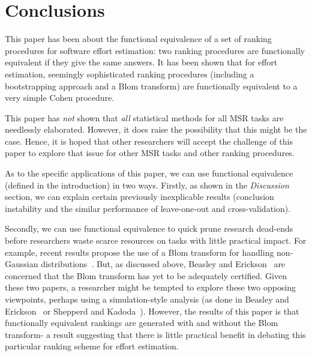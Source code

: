 \documentclass{sig-alternate}
\newcommand{\fig}[1]{Figure~\ref{fig:#1}}
\begin{document}


\section{Conclusions}

This paper has been about the functional equivalence of a set
of ranking procedures for software effort estimation: two
ranking procedures are functionally equivalent if they give
the same answers.  It has been shown that for effort
estimation, seemingly sophisticated
ranking procedures (including a bootstrapping approach and a Blom
transform) are functionally equivalent to a very simple
Cohen procedure.

This paper has {\em not} shown that {\em all} statistical methods
for all MSR tasks are needlessly elaborated. However, it
does raise the possibility that this might be the case. 
Hence, it is hoped
that other researchers will accept the challenge of this paper to
explore that issue for other MSR tasks and other ranking procedures.



As to the specific applications of this paper, we can use 
functional equivalence (defined in the introduction)
in two ways. Firstly, as shown in the {\em Discussion}
section, we can explain certain previously
inexplicable results (conclusion instability and the
similar performance of leave-one-out and cross-validation).

Secondly, we can use functional equivalence to  quick
prune 
research dead-ends before researchers waste  scarce
resources on tasks with little practical impact.
For example,
recent results propose the use of a Blom transform for
handling non-Gaussian distributions~\cite{mittas12a}.  
But, as discussed above,  Beasley and Erickson~\cite{beasley09} are concerned
that the Blom transform  has yet to be adequately certified.
Given
these two papers, a researcher might be tempted to explore these two
opposing viewpoints, perhaps using a simulation-style analysis 
(as done in Beasley and Erickson~\cite{beasley09} or Shepperd and Kadoda~\cite{shepperd01}).
 However, the results of this paper is that functionally equivalent
rankings are generated with and without the Blom transform- a
result suggesting that there is little practical benefit in debating
this particular ranking scheme for effort estimation.
\end{document}
